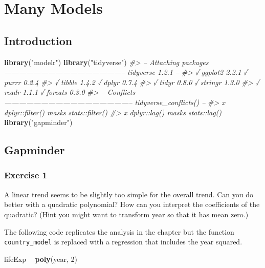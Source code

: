 \documentclass[]{book}
\newenvironment{Shaded}{\begin{snugshade}}{\end{snugshade}}
\newcommand{\CommentTok}[1]{\textcolor[rgb]{0.56,0.35,0.01}{\textit{#1}}}
\newcommand{\DecValTok}[1]{\textcolor[rgb]{0.00,0.00,0.81}{#1}}
\newcommand{\KeywordTok}[1]{\textcolor[rgb]{0.13,0.29,0.53}{\textbf{#1}}}
\newcommand{\NormalTok}[1]{#1}
\newcommand{\OperatorTok}[1]{\textcolor[rgb]{0.81,0.36,0.00}{\textbf{#1}}}
\newcommand{\StringTok}[1]{\textcolor[rgb]{0.31,0.60,0.02}{#1}}
\theoremstyle{definition}
\theoremstyle{definition}
\theoremstyle{definition}
\theoremstyle{remark}
\begin{document}
\hypertarget{many-models}{%
\chapter{Many Models}\label{many-models}}

\hypertarget{introduction-15}{%
\section{Introduction}\label{introduction-15}}

\begin{Shaded}
\begin{Highlighting}[]
\KeywordTok{library}\NormalTok{(}\StringTok{"modelr"}\NormalTok{)}
\KeywordTok{library}\NormalTok{(}\StringTok{"tidyverse"}\NormalTok{)}
\CommentTok{#> -- Attaching packages -------------------------------------------------- tidyverse 1.2.1 --}
\CommentTok{#> √ ggplot2 2.2.1     √ purrr   0.2.4}
\CommentTok{#> √ tibble  1.4.2     √ dplyr   0.7.4}
\CommentTok{#> √ tidyr   0.8.0     √ stringr 1.3.0}
\CommentTok{#> √ readr   1.1.1     √ forcats 0.3.0}
\CommentTok{#> -- Conflicts ----------------------------------------------------- tidyverse_conflicts() --}
\CommentTok{#> x dplyr::filter() masks stats::filter()}
\CommentTok{#> x dplyr::lag()    masks stats::lag()}
\KeywordTok{library}\NormalTok{(}\StringTok{"gapminder"}\NormalTok{)}
\end{Highlighting}
\end{Shaded}

\hypertarget{gapminder}{%
\section{Gapminder}\label{gapminder}}

\hypertarget{exercise-1-62}{%
\subsection{Exercise 1}\label{exercise-1-62}}

A linear trend seems to be slightly too simple for the overall trend.
Can you do better with a quadratic polynomial? How can you interpret the
coefficients of the quadratic? (Hint you might want to transform year so
that it has mean zero.)

The following code replicates the analysis in the chapter but the
function \texttt{country\_model} is replaced with a regression that
includes the year squared.

\begin{Shaded}
\begin{Highlighting}[]
\NormalTok{lifeExp }\OperatorTok{~}\StringTok{ }\KeywordTok{poly}\NormalTok{(year, }\DecValTok{2}\NormalTok{)}
\end{Highlighting}
\end{Shaded}
\end{document}
